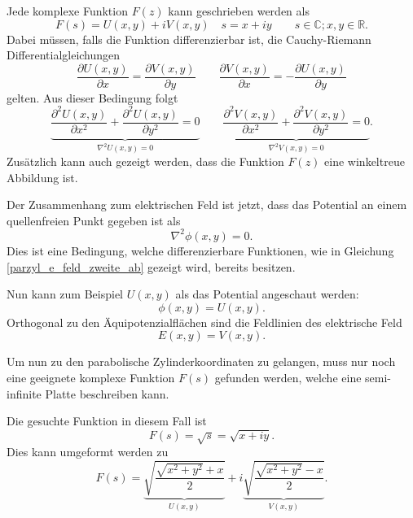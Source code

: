 Jede komplexe Funktion $F(z)$ kann geschrieben werden als
\begin{equation}
	F(s) = U(x,y) + iV(x,y) \quad s = x + iy \qquad s \in \mathbb{C}; x,y \in \mathbb{R}.
\end{equation}  
Dabei müssen, falls die Funktion differenzierbar ist, die Cauchy-Riemann Differentialgleichungen 
\begin{equation}
	\frac{\partial U(x,y)}{\partial x} 
	=
	\frac{\partial V(x,y)}{\partial y} 
	\qquad
	\frac{\partial V(x,y)}{\partial x}
	=
	-\frac{\partial U(x,y)}{\partial y}
\end{equation}
gelten.
Aus dieser Bedingung folgt 
\begin{equation}
	\label{parzyl_e_feld_zweite_ab}
	\underbrace{
		\frac{\partial^2 U(x,y)}{\partial x^2}
		+ 
		\frac{\partial^2 U(x,y)}{\partial y^2}
		=
		0
	}_{\displaystyle{\nabla^2U(x,y)=0}}
	\qquad
	\underbrace{
		\frac{\partial^2 V(x,y)}{\partial x^2}
		+
		\frac{\partial^2 V(x,y)}{\partial y^2}
		=
		0
	}_{\displaystyle{\nabla^2V(x,y) = 0}}.
\end{equation}
Zusätzlich kann auch gezeigt werden, dass die Funktion $F(z)$ eine winkeltreue Abbildung ist.


Der Zusammenhang zum elektrischen Feld ist jetzt, dass das Potential an einem quellenfreien Punkt gegeben ist als 
\begin{equation}
	\nabla^2\phi(x,y) = 0.
\end{equation}
Dies ist eine Bedingung, welche differenzierbare Funktionen, wie in Gleichung \eqref{parzyl_e_feld_zweite_ab} gezeigt wird, bereits besitzen. 


Nun kann zum Beispiel $U(x,y)$ als das Potential angeschaut werden:
\begin{equation}
	\phi(x,y) = U(x,y).
\end{equation}
Orthogonal zu den Äquipotenzialflächen sind die Feldlinien des elektrische Feld
\begin{equation}
	E(x,y) = V(x,y).
\end{equation}


Um nun zu den parabolische Zylinderkoordinaten zu gelangen, muss nur noch eine geeignete 
komplexe Funktion $F(s)$ gefunden werden, 
welche eine semi-infinite Platte beschreiben kann.


Die gesuchte Funktion in diesem Fall ist
\begin{equation}
	F(s) 
	= 
	\sqrt{s} 
	= 
	\sqrt{x + iy}.
\end{equation}
Dies kann umgeformt werden zu
\begin{equation}
	F(s) 
	= 
	\underbrace{\sqrt{\frac{\sqrt{x^2+y^2} + x}{2}}}_{U(x,y)} 
	+ 
	i\underbrace{\sqrt{\frac{\sqrt{x^2+y^2} - x}{2}}}_{V(x,y)}
	.
\end{equation}


